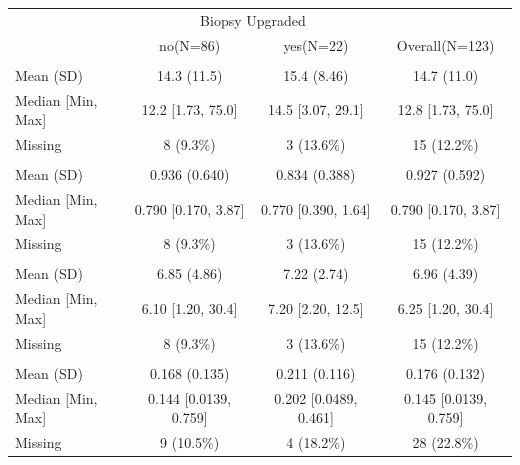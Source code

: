 \documentclass[]{article}
\begin{document}
\begin{tabular}{lccc}
\toprule
\multicolumn{1}{c}{ } & \multicolumn{2}{c}{Biopsy Upgraded} & \multicolumn{1}{c}{ } \\
\cmidrule(l{3pt}r{3pt}){2-3}
 & no(N=86) & yes(N=22) & Overall(N=123)\\
\midrule
\addlinespace[0.3em]
\multicolumn{4}{l}{\textbf{[-2]proPSA}}\\
\hspace{1em}Mean (SD) & 14.3 (11.5) & 15.4 (8.46) & 14.7 (11.0)\\
\hspace{1em}Median [Min, Max] & 12.2 [1.73, 75.0] & 14.5 [3.07, 29.1] & 12.8 [1.73, 75.0]\\
\hspace{1em}Missing & 8 (9.3\%) & 3 (13.6\%) & 15 \vphantom{3}(12.2\%)\\
\addlinespace[0.3em]
\multicolumn{4}{l}{\textbf{free PSA}}\\
\hspace{1em}Mean (SD) & 0.936 (0.640) & 0.834 (0.388) & 0.927 (0.592)\\
\hspace{1em}Median [Min, Max] & 0.790 [0.170, 3.87] & 0.770 [0.390, 1.64] & 0.790 [0.170, 3.87]\\
\hspace{1em}Missing & 8 (9.3\%) & 3 (13.6\%) & 15 \vphantom{2}(12.2\%)\\
\addlinespace[0.3em]
\multicolumn{4}{l}{\textbf{PSAHyb}}\\
\hspace{1em}Mean (SD) & 6.85 (4.86) & 7.22 (2.74) & 6.96 (4.39)\\
\hspace{1em}Median [Min, Max] & 6.10 [1.20, 30.4] & 7.20 [2.20, 12.5] & 6.25 [1.20, 30.4]\\
\hspace{1em}Missing & 8 (9.3\%) & 3 (13.6\%) & 15 \vphantom{1}(12.2\%)\\
\addlinespace[0.3em]
\multicolumn{4}{l}{\textbf{PSADensity}}\\
\hspace{1em}Mean (SD) & 0.168 (0.135) & 0.211 (0.116) & 0.176 (0.132)\\
\hspace{1em}Median [Min, Max] & 0.144 [0.0139, 0.759] & 0.202 [0.0489, 0.461] & 0.145 [0.0139, 0.759]\\
\hspace{1em}Missing & 9 (10.5\%) & 4 (18.2\%) & 28 \vphantom{1}(22.8\%)\\

\end{tabular}
\end{document}
